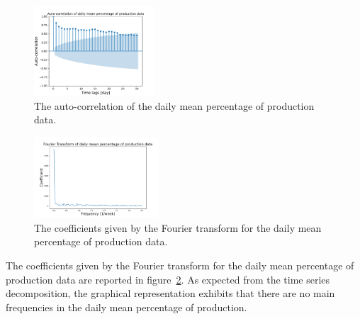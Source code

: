 \begin{figure}[H]
\centering
\includegraphics[width=0.4\textwidth]{images/production/daily_aggregated_correlation}
\caption{The auto-correlation of the daily mean percentage of production data.}
\label{fig:productioncorrelationday}
\end{figure}

\begin{figure}[H]
\centering
\includegraphics[width=0.415\textwidth]{images/production/ft_day}
\caption{The coefficients given by the Fourier transform for the daily mean percentage of production data.}
\label{fig:productionftday}
\end{figure}

The coefficients given by the Fourier transform for the daily mean percentage of production data are reported in figure~\ref{fig:productionftday}.
As expected from the time series decomposition, the graphical representation exhibits that there are no main frequencies in the daily mean percentage of production.

